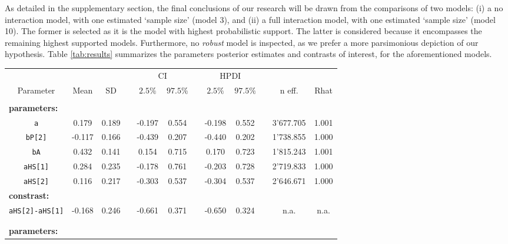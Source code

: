 As detailed in the supplementary section, the final conclusions of our research will be drawn from the comparisons of two models: (i) a no interaction model, with one estimated `sample size' (model 3), and (ii) a full interaction model, with one estimated `sample size' (model 10). The former is selected as it is the model with highest probabilistic support. The latter is considered because it encompasses the remaining highest supported models. Furthermore, no \textit{robust} model is inspected, as we prefer a more parsimonious depiction of our hypothesis. Table \ref{tab:results} summarizes the parameters posterior estimates and contrasts of interest, for the aforementioned models.
%
\begin{table}[h!]
	\centering
	\begin{tabular}{|cccccccccccc|} 
		\hline
		& \multicolumn{3}{c}{} & \multicolumn{2}{c}{CI} & & \multicolumn{2}{c}{HPDI} & & \multicolumn{2}{c|}{}\\[0.5ex]
		\cline{5-6} \cline{8-9}
		Parameter & Mean & SD & & $2.5\%$ & $97.5\%$ & & $2.5\%$ & $97.5\%$ & & n eff. & Rhat \\[0.5ex] 
		\hline\hline
		\rowcolor{gray}
		\multicolumn{12}{|l|}{ \textbf{Model 3: No interaction (one `size')} } \\
		\multicolumn{12}{|l|}{ \textbf{parameters:} } \\
		\texttt{a} & 0.179 & 0.189 & & -0.197 & 0.554 & & -0.198 & 0.552 & & 3'677.705 & 1.001\\
		\texttt{bP[2]} & -0.117 & 0.166 & & -0.439 & 0.207 & & -0.440 & 0.202 & & 1'738.855 & 1.000 \\
		\texttt{bA} & 0.432 & 0.141 & & 0.154 & 0.715 & & 0.170 & 0.723 & & 1'815.243 & 1.001 \\
		\texttt{aHS[1]} & 0.284 & 0.235 & & -0.178 & 0.761 & & -0.203 & 0.728 & & 2'719.833 & 1.000 \\
		\texttt{aHS[2]} & 0.116 & 0.217 & & -0.303 & 0.537 & & -0.304 & 0.537 & & 2'646.671 & 1.000 \\
		\multicolumn{12}{|l|}{ \textbf{constrast:} } \\
		\texttt{aHS[2]-aHS[1]} & -0.168 & 0.246 & & -0.661 & 0.371 & & -0.650 & 0.324 & & n.a. & n.a. \\
		\multicolumn{12}{|l|}{ } \\
		\rowcolor{gray}
		\multicolumn{12}{|l|}{ \textbf{Model 10: Full interaction (one `size')} } \\
		\multicolumn{12}{|l|}{ \textbf{parameters:} } \\

\end{tabular}
\end{table}
